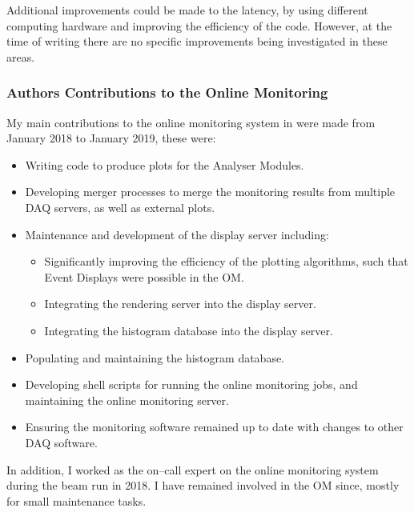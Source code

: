 Additional improvements could be made to the latency, by using different 
computing hardware and improving the efficiency of the code. However, at the 
time of writing there are no specific improvements being investigated in these 
areas.

\subsubsection*{Authors Contributions to the \protodune{} Online Monitoring}
My main contributions to the online monitoring system in \protodune{} were made
from January 2018 to January 2019, these were: 
\begin{itemize}
	\item Writing code to produce plots for the Analyser Modules.
	\item Developing merger processes to merge the monitoring results from
		multiple DAQ servers, as well as external plots.
	\item Maintenance and development of the display server including:
	\begin{itemize}
		\item Significantly improving the efficiency of the plotting algorithms,
			such that Event Displays were possible in the OM.
		\item Integrating the rendering server into the display server.
		\item Integrating the histogram database into the display server.
	\end{itemize}
	\item Populating and maintaining the histogram database.
	\item Developing shell scripts for running the online monitoring jobs, and
		maintaining the online monitoring server.
	\item Ensuring the monitoring software remained up to date with changes to
		other DAQ software.
\end{itemize}
In addition, I worked as the on--call expert on the online monitoring system
during the \protodune{} beam run in 2018. I have remained involved in the OM 
since, mostly for small maintenance tasks. 
